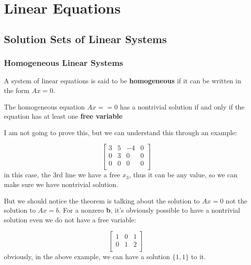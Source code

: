 \chapter{Linear Equations}

\section{Solution Sets of Linear Systems}

\subsection{Homogeneous Linear Systems}

A system of linear equations is said to be \textbf{homogeneous} if it can be written in the form \(Ax = 0\).  

\begin{theorem}
    The homogeneous equation \(Ax == 0\) has a nontrivial solution if and only if the equation has at least one \textbf{free variable}   
\end{theorem}

I am not going to prove this, but we can understand this through an example:

\[
    \begin{bmatrix}
        3 & 5 & -4 &  0 \\
        0 & 3 & 0 &  0 \\
        0 & 0 & 0 &  0 \\
    \end{bmatrix}
\]
in this case, the 3rd line we have a free \(x_3\), thus it can be any value, so we can make sure we have nontrivial solution. 

But we should notice the theorem is talking about the solution to \(Ax = 0\) not the solution to \(Ax = b\). For a nonzero \textbf{b}, it's obviously possible to have a nontrivial solution even we do not have a free variable:

\[
\begin{bmatrix}
    1 & 0 & 1   \\
    0 & 1 & 2  \\
\end{bmatrix}
\]
obviously, in the above example, we can have a solution \(\{1, 1\}\) to it. 


